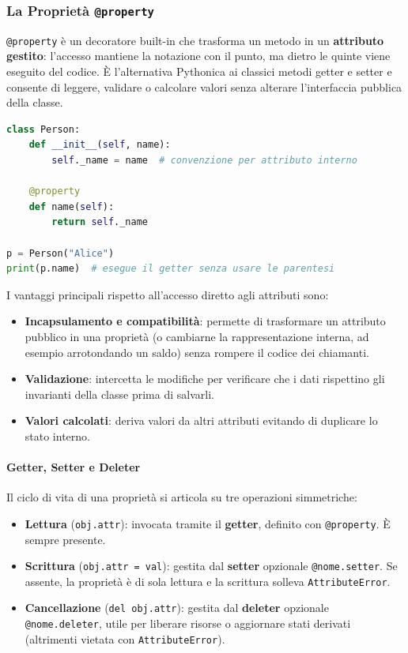 \documentclass[12pt]{extarticle}
\begin{document}
\subsubsection{La Proprietà \texttt{@property}}

\texttt{@property} è un decoratore built-in che trasforma un metodo in un \textbf{attributo gestito}: l'accesso mantiene la notazione con il punto, ma dietro le quinte viene eseguito del codice. È l'alternativa Pythonica ai classici metodi getter e setter e consente di leggere, validare o calcolare valori senza alterare l'interfaccia pubblica della classe.

\begin{lstlisting}[language=Python]
class Person:
    def __init__(self, name):
        self._name = name  # convenzione per attributo interno

    @property
    def name(self):
        return self._name

p = Person("Alice")
print(p.name)  # esegue il getter senza usare le parentesi
\end{lstlisting}

I vantaggi principali rispetto all'accesso diretto agli attributi sono:
\begin{itemize}
    \item \textbf{Incapsulamento e compatibilità}: permette di trasformare un attributo pubblico in una proprietà (o cambiarne la rappresentazione interna, ad esempio arrotondando un saldo) senza rompere il codice dei chiamanti.
    \item \textbf{Validazione}: intercetta le modifiche per verificare che i dati rispettino gli invarianti della classe prima di salvarli.
    \item \textbf{Valori calcolati}: deriva valori da altri attributi evitando di duplicare lo stato interno.
\end{itemize}

\paragraph{Getter, Setter e Deleter}

Il ciclo di vita di una proprietà si articola su tre operazioni simmetriche:
\begin{itemize}
    \item \textbf{Lettura} (\texttt{obj.attr}): invocata tramite il \textbf{getter}, definito con \texttt{@property}. È sempre presente.
    \item \textbf{Scrittura} (\texttt{obj.attr = val}): gestita dal \textbf{setter} opzionale \texttt{@nome.setter}. Se assente, la proprietà è di sola lettura e la scrittura solleva \texttt{AttributeError}.
    \item \textbf{Cancellazione} (\texttt{del obj.attr}): gestita dal \textbf{deleter} opzionale \texttt{@nome.deleter}, utile per liberare risorse o aggiornare stati derivati (altrimenti vietata con \texttt{AttributeError}).
\end{itemize}
\end{document}

